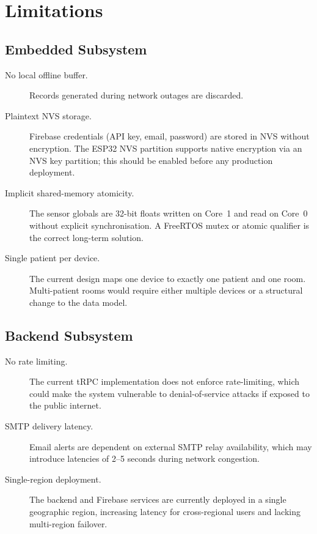 \section{Limitations}

\subsection{Embedded Subsystem}

\begin{description}
	\item[No local offline buffer.]
	      Records generated during network outages are discarded.

	\item[Plaintext NVS storage.]
	      Firebase credentials (API key, email, password) are stored in NVS without
	      encryption.
	      The ESP32 NVS partition supports native encryption via an NVS key partition;
	      this should be enabled before any production deployment.

	\item[Implicit shared-memory atomicity.]
	      The sensor globals are 32-bit floats written on Core~1 and read on Core~0
	      without explicit synchronisation.
	      A FreeRTOS mutex or atomic qualifier is the correct long-term solution.

	\item[Single patient per device.]
	      The current design maps one device to exactly one patient and one room.
	      Multi-patient rooms would require either multiple devices or a structural change
	      to the data model.
\end{description}

\subsection{Backend Subsystem}
\begin{description}
	\item[No rate limiting.] The current tRPC implementation does not enforce rate-limiting, which could make the system vulnerable to denial-of-service attacks if exposed to the public internet.
	\item[SMTP delivery latency.] Email alerts are dependent on external SMTP relay availability, which may introduce latencies of 2--5 seconds during network congestion.
	\item[Single-region deployment.] The backend and Firebase services are currently deployed in a single geographic region, increasing latency for cross-regional users and lacking multi-region failover.
\end{description}


